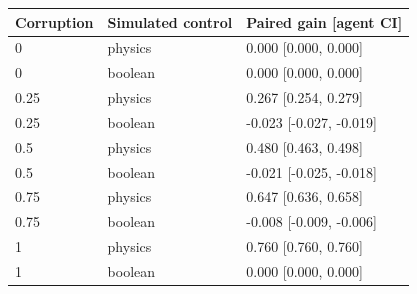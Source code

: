 \begin{tabular}{lll}\toprule
Corruption & Simulated control & Paired gain [agent CI]\\ \midrule
0 & physics & 0.000 [0.000, 0.000]\\
0 & boolean & 0.000 [0.000, 0.000]\\
0.25 & physics & 0.267 [0.254, 0.279]\\
0.25 & boolean & -0.023 [-0.027, -0.019]\\
0.5 & physics & 0.480 [0.463, 0.498]\\
0.5 & boolean & -0.021 [-0.025, -0.018]\\
0.75 & physics & 0.647 [0.636, 0.658]\\
0.75 & boolean & -0.008 [-0.009, -0.006]\\
1 & physics & 0.760 [0.760, 0.760]\\
1 & boolean & 0.000 [0.000, 0.000]\\
\bottomrule\end{tabular}
